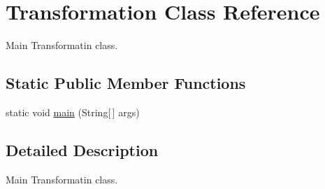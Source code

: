 \hypertarget{class_transformation}{}\section{Transformation Class Reference}
\label{class_transformation}


Main Transformatin class.  


\subsection*{Static Public Member Functions}
\begin{DoxyCompactItemize}
\item 
static void \hyperlink{class_transformation_afe43b1123ddd254a15446af548bd251f}{main} (String\mbox{[}$\,$\mbox{]} args)
\end{DoxyCompactItemize}


\subsection{Detailed Description}
Main Transformatin class. 

